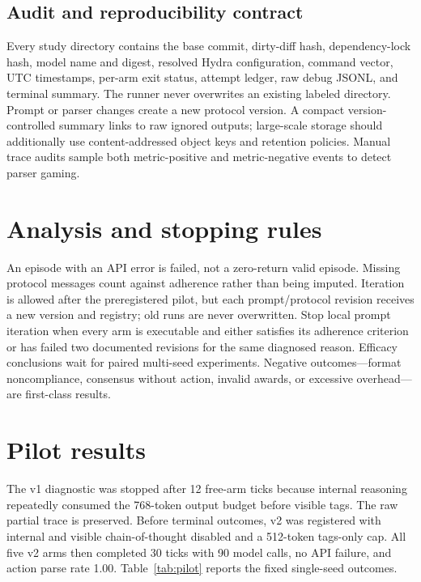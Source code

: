 \documentclass[11pt]{article}
\begin{document}
\subsection{Audit and reproducibility contract}
Every study directory contains the base commit, dirty-diff hash, dependency-lock hash, model name and digest, resolved Hydra configuration, command vector, UTC timestamps, per-arm exit status, attempt ledger, raw debug JSONL, and terminal summary. The runner never overwrites an existing labeled directory. Prompt or parser changes create a new protocol version. A compact version-controlled summary links to raw ignored outputs; large-scale storage should additionally use content-addressed object keys and retention policies. Manual trace audits sample both metric-positive and metric-negative events to detect parser gaming.

\section{Analysis and stopping rules}
An episode with an API error is failed, not a zero-return valid episode. Missing protocol messages count against adherence rather than being imputed. Iteration is allowed after the preregistered pilot, but each prompt/protocol revision receives a new version and registry; old runs are never overwritten. Stop local prompt iteration when every arm is executable and either satisfies its adherence criterion or has failed two documented revisions for the same diagnosed reason. Efficacy conclusions wait for paired multi-seed experiments. Negative outcomes---format noncompliance, consensus without action, invalid awards, or excessive overhead---are first-class results.

\section{Pilot results}
The v1 diagnostic was stopped after 12 free-arm ticks because internal reasoning repeatedly consumed the 768-token output budget before visible tags. The raw partial trace is preserved. Before terminal outcomes, v2 was registered with internal and visible chain-of-thought disabled and a 512-token tags-only cap. All five v2 arms then completed 30 ticks with 90 model calls, no API failure, and action parse rate 1.00. Table~\ref{tab:pilot} reports the fixed single-seed outcomes.
\end{document}
